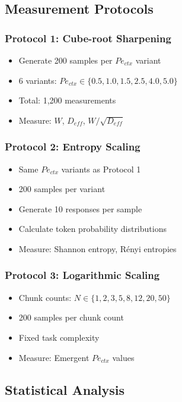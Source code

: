 \documentclass[conference]{IEEEtran}
\begin{document}
\subsection{Measurement Protocols}

\subsubsection{Protocol 1: Cube-root Sharpening}

\begin{itemize}
\item Generate 200 samples per $Pe_{ctx}$ variant
\item 6 variants: $Pe_{ctx} \in \{0.5, 1.0, 1.5, 2.5, 4.0, 5.0\}$
\item Total: 1,200 measurements
\item Measure: $W$, $D_{eff}$, $W/\sqrt{D_{eff}}$
\end{itemize}

\subsubsection{Protocol 2: Entropy Scaling}

\begin{itemize}
\item Same $Pe_{ctx}$ variants as Protocol 1
\item 200 samples per variant
\item Generate 10 responses per sample
\item Calculate token probability distributions
\item Measure: Shannon entropy, Rényi entropies
\end{itemize}

\subsubsection{Protocol 3: Logarithmic Scaling}

\begin{itemize}
\item Chunk counts: $N \in \{1, 2, 3, 5, 8, 12, 20, 50\}$
\item 200 samples per chunk count
\item Fixed task complexity
\item Measure: Emergent $Pe_{ctx}$ values
\end{itemize}

\subsection{Statistical Analysis}
\end{document}
